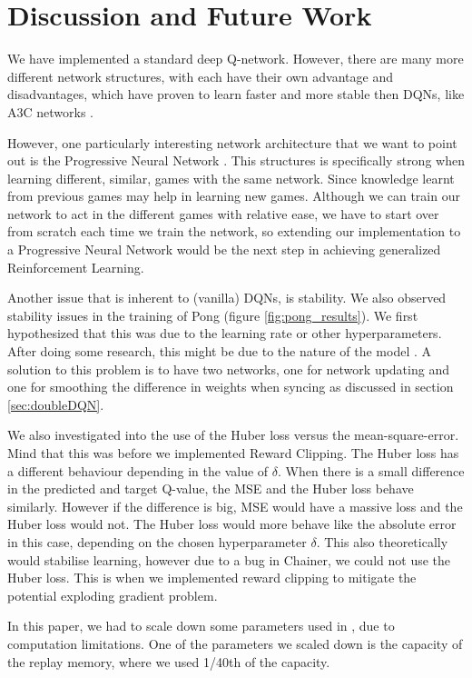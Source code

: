 \documentclass{article}
\begin{document}
\section{Discussion and Future Work}
We have implemented a standard deep Q-network. However, there are many more different network structures, with each have their own advantage and disadvantages, which have proven to learn faster and more stable then DQNs, like A3C networks \cite{DBLP:journals/corr/MnihBMGLHSK16}. 

However, one particularly interesting network architecture that we want to point out is the Progressive Neural Network \cite{DBLP:journals/corr/RusuRDSKKPH16}. This structures is specifically strong when learning different, similar, games with the same network. Since knowledge learnt from previous games may help in learning new games. Although we can train our network to act in the different games with relative ease, we have to start over from scratch each time we train the network, so extending our implementation to a Progressive Neural Network would be the next step in achieving generalized Reinforcement Learning.

Another issue that is inherent to (vanilla) DQNs, is stability. We also observed stability issues in the training of Pong (figure \ref{fig:pong_results}). We first hypothesized that this was due to the learning rate or other hyperparameters. After doing some research, this might be due to the nature of the model \cite{van2016deep}. A solution to this problem is to have two networks, one for network updating and one for smoothing the difference in weights when syncing as discussed in section \ref{sec:doubleDQN}.

We also investigated into the use of the Huber loss versus the mean-square-error. Mind that this was before we implemented Reward Clipping. The Huber loss has a different behaviour depending in the value of $\delta$. When there is a small difference in the predicted and target Q-value, the MSE and the Huber loss behave similarly. However if the difference is big, MSE would have a massive loss and the Huber loss would not. The Huber loss would more behave like the absolute error in this case, depending on the chosen hyperparameter $\delta$. This also theoretically would stabilise learning, however due to a bug in Chainer, we could not use the Huber loss. This is when we implemented reward clipping to mitigate the potential exploding gradient problem.

In this paper, we had to scale down some parameters used in \cite{mnih2015human}, due to computation limitations. One of the parameters we scaled down is the capacity of the replay memory, where we used 1/40th of the capacity.




\end{document}
